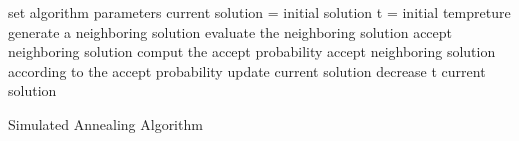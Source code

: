 \begin{algorithm2e}[h]
	set algorithm parameters\;
	current solution = initial solution\;
	t = initial tempreture\;
	{
		{
			generate a neighboring solution\;
			evaluate the neighboring solution\;
			{
				accept neighboring solution\;
			}
			{
				comput the accept probability\;
				accept neighboring solution according to the accept probability\;
			}
			update current solution\;
		}
		decrease t\;
	}
	\Return current solution\;
	\caption{Simulated Annealing Algorithm}
	\label{algo:simulated_annealing}
\end{algorithm2e}